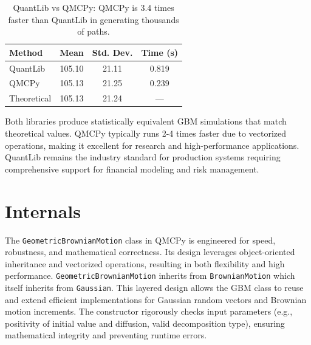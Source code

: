 \documentclass{article}
\begin{document}
\begin{table}[t]
\centering
\caption{QuantLib vs QMCPy: QMCPy is 3.4 times faster than QuantLib in generating thousands of paths.}
\begin{tabular}{lccc}
\toprule
\textbf{Method} & \textbf{Mean} & \textbf{Std. Dev.} & \textbf{Time (s)}   \\
\midrule
QuantLib & 105.10 & 21.11 & 0.819  \\
QMCPy & 105.13 & 21.25 & 0.239  \\
Theoretical & 105.13 & 21.24 & ---  \\
\bottomrule
\end{tabular}
\label{tab2}
\end{table}

Both libraries produce statistically equivalent GBM simulations that match theoretical values. QMCPy typically runs 2-4 times faster due to vectorized operations, making it excellent for research and high-performance applications. QuantLib remains the industry standard for production systems requiring comprehensive  support for financial modeling and risk management.


\section{Internals}

The \texttt{GeometricBrownianMotion} class in QMCPy is engineered for speed, robustness, and mathematical correctness. Its design leverages object-oriented inheritance and vectorized operations, resulting in both flexibility and high performance.
\texttt{GeometricBrownianMotion} inherits from \texttt{BrownianMotion} which itself inherits from \texttt{Gaussian}. This layered design allows the GBM class to reuse and extend efficient implementations for Gaussian random vectors and Brownian motion increments.
The constructor rigorously checks input parameters (e.g., positivity of initial value and diffusion, valid decomposition type), ensuring mathematical integrity and preventing runtime errors.
\end{document}
